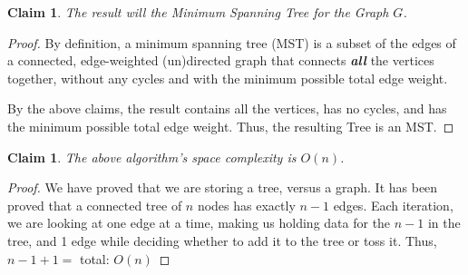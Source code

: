 \documentclass[11pt]{article}
\newtheorem{claim}[theorem]{Claim}
\begin{document}
	\begin{claim} 
	The result will the Minimum Spanning Tree for the Graph $G$.
\end{claim}

\begin{proof}
	By definition, a minimum spanning tree (MST) is a subset of the edges of a connected, edge-weighted (un)directed graph that connects \textbf{\textit{all}} the vertices together, without any cycles and with the minimum possible total edge weight.
	
	By the above claims, the result contains all the vertices, has no cycles, and has the minimum possible total edge weight. Thus, the resulting Tree is an MST.
\end{proof}

	\begin{claim} 
	The above algorithm's space complexity is $O(n)$. 
\end{claim}

\begin{proof}
	We have proved that we are storing a tree, versus a graph. It has been proved that a connected tree of $n$ nodes has exactly $n-1$ edges. Each iteration, we are looking at one edge at a time, making us holding data for the $n-1$ in the tree, and 1 edge while deciding whether to add it to the tree or toss it. Thus, $n-1+1 =$ total: $O(n)$
\end{proof}

	\newpage
	
	
\end{document}
